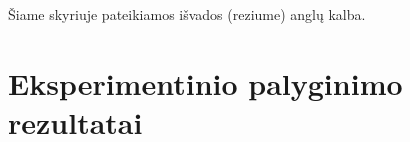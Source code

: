 \documentclass{VUMIFInfBakalaurinis}
\begin{document}
Šiame skyriuje pateikiamos išvados (reziume) anglų kalba.

\printbibliography[heading=bibintoc]

\appendix  %


\section{Eksperimentinio palyginimo rezultatai}
\end{document}
